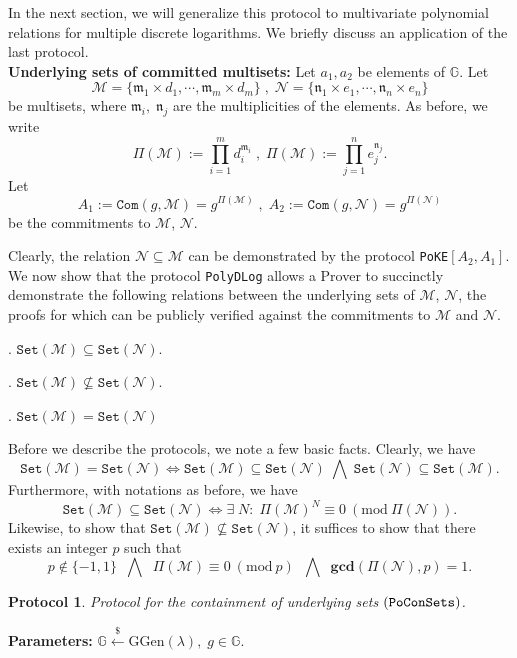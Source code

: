\documentclass[11pt, lettersize, notitlepage, leqno, footskip=0.6cm]{article}
\newcommand{\pl}{\prod\limits}
\newcommand{\ttt}{\texttt}
\newcommand{\sett}{\ttt{Set}}
\newcommand{\LRA}{\Longleftrightarrow}
\newcommand{\mf}{\mathfrak}
\newcommand{\mc}{\mathcal}
\newcommand{\mb}{\mathbb}
\newcommand{\mbf}{\mathbf}
\newcommand{\mr}{\mathrm}
\newcommand{\mfm}{\mathfrak{m}}
\newcommand{\mfn}{\mathfrak{n}}
\newcommand{\lamb}{\lambda}
\newcommand{\sub}{\subseteq}
\newcommand{\nsub}{\nsubseteq}
\newcommand{\vs}{\vspace{-0.15cm}}
\newcommand{\noin}{\noindent}
\newcommand{\Mod}[1]{\ (\mathrm{mod}\ #1)}
\newcommand{\GCD}{\mbf{gcd}}
\newtheorem{Prot}[Thm]{Protocol}
\numberwithin{equation}{section}
\begin{document}
\noin In the next section, we will generalize this protocol to multivariate polynomial relations for multiple discrete logarithms. We briefly discuss an application of the last protocol.\\

\noin \textbf{Underlying sets of committed multisets:} Let $a_1,a_2$ be elements of $\mb{G}$. Let \vs $$\mc{M} = \{\mf{m}_1\times d_1,\cdots, \mf{m}_m\times d_m \}\;,\;\mc{N} = \{\mf{n}_1\times e_1,\cdots, \mf{n}_n\times e_n \}$$ be multisets, where $\mf{m}_i,\;\mf{n}_j$ are the multiplicities of the elements. As before, we write \vs $$\Pi(\mc{M}):= \pl_{i=1}^m d_i^{\mfm_i}\;,\; \Pi(\mc{M}):= \pl_{j=1}^n e_j^{\mfn_j}.$$ Let \vs $$A_1:= \ttt{Com}(g, \mc{M}) =  g^{\Pi(\mc{M})}\;,\; A_2:= \ttt{Com}(g, \mc{N}) = g^{\Pi(\mc{N})}$$ be the commitments to $\mc{M}$, $\mc{N}$.

Clearly, the relation $\mc{N}\sub \mc{M}$ can be demonstrated by the protocol \verb|PoKE|$[A_2, A_1]$. We now show that the protocol \verb|PolyDLog| allows a Prover to succinctly demonstrate the following relations between the underlying sets of $\mc{M}$, $\mc{N}$, the proofs for which can be publicly verified against the commitments to $\mc{M}$ and $\mc{N}$.\vspace{0.1cm}

\noin 1. $\sett(\mc{M})\sub \sett(\mc{N})$.

\noin 2. $\sett(\mc{M})\nsub \sett(\mc{N})$.

\noin 3. $\sett(\mc{M}) = \sett(\mc{N})$ \vspace{0.1cm}

\noin Before we describe the protocols, we note a few basic facts. Clearly, we have \vs $$\sett(\mc{M}) = \sett(\mc{N})\LRA \sett(\mc{M}) \sub \sett(\mc{N})\;\bigwedge\; \sett(\mc{N}) \sub \sett(\mc{M}).$$ Furthermore, with notations as before, we have \vs $$\sett(\mc{M})\sub \sett(\mc{N})\LRA \exists\; N:\;\Pi(\mc{M})^N\equiv 0\Mod{\Pi(\mc{N})}.$$ Likewise, to show that $\sett(\mc{M})\nsub \sett(\mc{N})$, it suffices to show that there exists an integer $p$ such that \vs $$p\notin \{-1,1\}   \;\;\bigwedge\;\;\Pi(\mc{M})\equiv 0\Mod{p} \;\;\bigwedge\;\; \GCD(\Pi(\mc{N}),{p})=1.$$ 

\begin{Prot} Protocol for the containment of underlying sets $(\tt{PoConSets})$.\end{Prot} \vspace{-0.3cm}

\noin \textbf{Parameters:} $\mb{G}\xleftarrow{\$} \mr{GGen}(\lamb), \; g\in \mb{G}$.
\end{document}
